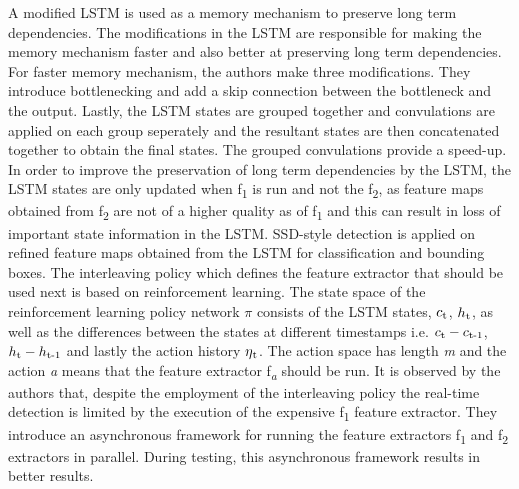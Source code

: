 \documentclass[conference]{IEEEtran}
\begin{document}
A modified LSTM is used as a memory mechanism to preserve long term dependencies. The modifications in the LSTM are responsible for making the memory mechanism faster and also better at preserving long term dependencies. For faster memory mechanism, the authors make three modifications. They introduce bottlenecking and add a skip connection between the bottleneck and the output. Lastly, the LSTM states are grouped together and convulations are applied on each group seperately and the resultant states are then concatenated together to obtain the final states. The grouped convulations provide a speed-up. In order to improve the preservation of long term dependencies by the LSTM, the LSTM states are only updated when f\textsubscript{1} is run and not the f\textsubscript{2}, as feature maps obtained from f\textsubscript{2} are not of a higher quality as of f\textsubscript{1} and this can result in loss of important state information in the LSTM. \newline
SSD-style detection is applied on refined feature maps obtained from the LSTM for classification and bounding boxes. \newline
The interleaving policy which defines the feature extractor that should be used next is based on reinforcement learning. The state space of the reinforcement learning policy network $\pi$ consists of the LSTM states, $c\textsubscript{t}$, $h\textsubscript{t}$, as well as the differences between the states at different timestamps i.e. $c\textsubscript{t}-c\textsubscript{t-1}$, $h\textsubscript{t}-h\textsubscript{t-1}$ and lastly the action history $\eta\textsubscript{t}$. The action space has length \textit{m} and the action \textit{a} means that the feature extractor f\textsubscript{\textit{a}} should be run. \newline
It is observed by the authors that, despite the employment of the interleaving policy the real-time detection is limited by the execution of the expensive f\textsubscript{1} feature extractor. They introduce an asynchronous framework for running the feature extractors f\textsubscript{1} and f\textsubscript{2} extractors in parallel. During testing, this asynchronous framework results in better results. \newline
\end{document}
